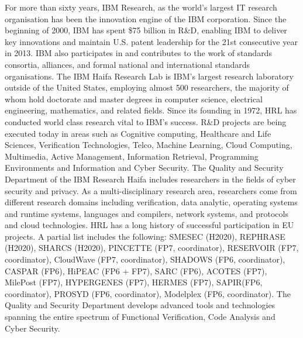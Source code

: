 \documentclass[a4paper,11pt]{article}
\begin{document}
For more than sixty years, IBM Research, as the world's largest IT research organisation has been the innovation engine of the IBM corporation. Since the beginning of 2000, IBM has spent \$75 billion in R\&D, enabling IBM to deliver key innovations and maintain U.S. patent leadership for the 21st consecutive
year in 2013.
IBM also participates in and contributes to the work of standards consortia, alliances, and formal national and international standards organisations. 
The IBM Haifa Research Lab is IBM's largest research laboratory outside of the United States, 
employing almost 500 researchers, the majority of whom hold doctorate and master degrees in computer science, electrical engineering, mathematics, and related fields. Since its founding in 1972, HRL has conducted world class research vital to IBM's success. R\&D projects are being executed today in areas such as Cognitive computing, Healthcare and Life Sciences, Verification Technologies, Telco, Machine Learning, Cloud Computing, Multimedia, Active Management, Information Retrieval, Programming Environments and Information and Cyber Security. The Quality and Security Department of the IBM Research Haifa includes researchers in the fields of cyber security and privacy. As a multi-disciplinary research area, researchers come from different research domains including verification, data analytic, operating systems and runtime systems, languages and compilers, network systems, and protocols and cloud technologies.
HRL has a long history of successful participation in EU projects. A partial list includes the following: SMESEC (H2020), REPHRASE (H2020), SHARCS (H2020), PINCETTE (FP7, coordinator), RESERVOIR (FP7, coordinator), CloudWave (FP7, coordinator), SHADOWS (FP6, coordinator), CASPAR (FP6), HiPEAC (FP6 + FP7), SARC (FP6), ACOTES (FP7), MilePost (FP7), HYPERGENES (FP7), HERMES (FP7), SAPIR(FP6, coordinator), PROSYD (FP6, coordinator), Modelplex (FP6, coordinator).
The Quality and Security Department develops advanced tools and technologies spanning the entire spectrum of Functional Verification, Code Analysis and Cyber Security.
\end{document}
